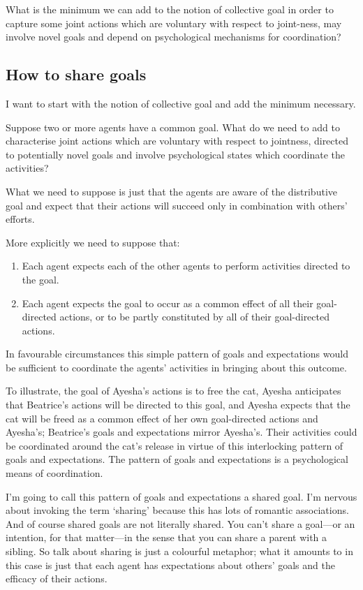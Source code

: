 \documentclass[14pt,a4paper]{extarticle}
\begin{document}
What is the minimum we can add to the notion of collective goal in order to capture some joint actions which are voluntary with respect to joint-ness, may involve novel goals and depend on psychological mechanisms for coordination?


\subsection{How to share goals}
I want to start with the notion of collective goal and add the minimum necessary.  

Suppose two or more agents have a common goal.  What do we need to add to characterise joint actions which are voluntary with respect to jointness, directed to potentially novel goals and involve psychological states which coordinate the activities?

What we need to suppose is just that the agents are aware of the distributive goal and expect that their actions will succeed only in combination with others' efforts.

More explicitly we need to suppose that:
%
\begin{enumerate}
\item Each agent expects each of the other agents to perform activities directed to the goal.
\item Each agent expects the goal to occur as a common effect of all their goal-directed actions, or to be partly constituted by all of their goal-directed actions.
\end{enumerate}
%
In favourable circumstances this simple pattern of goals and expectations would be sufficient to coordinate the agents’ activities in bringing about this outcome. 

To illustrate, the goal of Ayesha's actions is to free the cat, Ayesha anticipates that Beatrice's actions will be directed to this goal, and Ayesha expects that the cat will be freed as a common effect of her own goal-directed actions and Ayesha’s; Beatrice's goals and expectations mirror Ayesha's. 
Their activities could be coordinated around the cat's release in virtue of this interlocking pattern of goals and expectations. The pattern of goals and expectations is a psychological means of coordination.

I'm going to call this pattern of goals and expectations a shared goal.  I'm nervous about invoking the term `sharing' because this has lots of romantic associations.  And of course shared goals are not literally shared.  You can't share a goal---or an intention, for that matter---in the sense that you can share a parent with a sibling.  So talk about sharing is just a colourful metaphor; what it amounts to in this case is just that each agent has expectations about others' goals and the efficacy of their actions.
\end{document}
